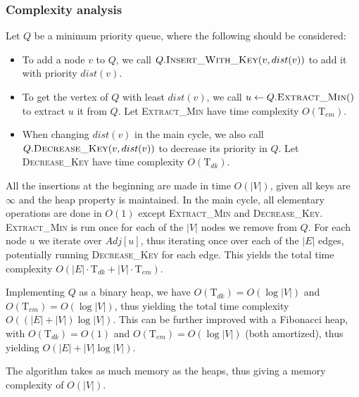 \subsubsection{Complexity analysis}
Let $Q$ be a minimum priority queue, where the following should be considered:
\begin{itemize}
    \item To add a node $v$ to $Q$, we call $Q.\textsc{Insert\_With\_Key}(v, dist(v))$ to add it with priority $dist(v)$.
    \item To get the vertex of $Q$ with least $dist(v)$, we call $u \gets Q.\textsc{Extract\_Min}()$ to extract $u$ it from $Q$. Let \textsc{Extract\_Min} have time complexity $O(\text{T}_{em})$.
    \item When changing $dist(v)$ in the main cycle, we also call $Q.\textsc{Decrease\_Key}(v, dist(v))$ to decrease its priority in $Q$. Let \textsc{Decrease\_Key} have time complexity $O(\text{T}_{dk})$.
\end{itemize}
All the insertions at the beginning are made in time $O(|V|)$, given all keys are $\infty$ and the heap property is maintained. In the main cycle, all elementary operations are done in $O(1)$ except \textsc{Extract\_Min} and \textsc{Decrease\_Key}. \textsc{Extract\_Min} is run once for each of the $|V|$ nodes we remove from $Q$. For each node $u$ we iterate over $Adj[u]$, thus iterating once over each of the $|E|$ edges, potentially running \textsc{Decrease\_Key} for each edge. This yields the total time complexity $O(|E|\cdot \text{T}_{dk}+|V|\cdot \text{T}_{em})$. \par
Implementing $Q$ as a binary heap, we have $O(\text{T}_{dk})=O(\log |V|)$ and $O(\text{T}_{em})=O(\log |V|)$, thus yielding the total time complexity $O((|E|+|V|)\log |V|)$. This can be further improved with a Fibonacci heap, with $O(\text{T}_{dk})=O(1)$ and $O(\text{T}_{em})=O(\log |V|)$ (both amortized), thus yielding $O(|E| + |V|\log |V|)$.\par
The algorithm takes as much memory as the heaps, thus giving a memory complexity of $O(|V|)$.
